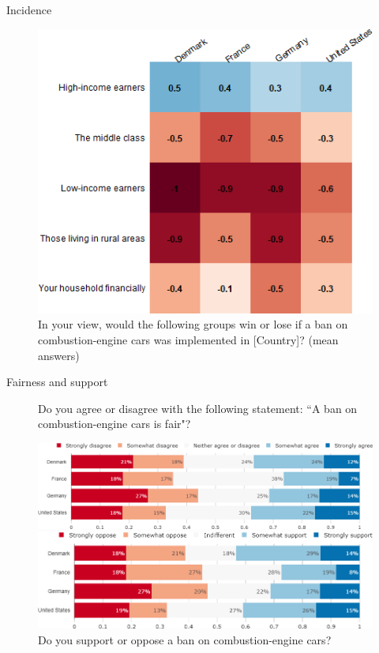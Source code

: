 \documentclass[aspectratio=169,9pt,dvipsnames]{beamer}
\begin{document}
\begin{frame}{Incidence}%
\begin{figure}[h!]
\centering
\caption{In your view, would the following groups win or lose if a ban on combustion-engine cars was implemented in [Country]? (mean answers)}
\includegraphics[width=.45\textwidth]{../figures/country_comparison/standard_win_lose_mean_countries.png}
\end{figure}
\end{frame}

\begin{frame}{Fairness and support}%
\begin{figure}[h!]
\centering
\caption{Do you agree or disagree with the following statement: ``A ban on combustion-engine cars is fair"?}
\includegraphics[width=.7\textwidth]{../figures/country_comparison/standard_fair_countries.png}
\vspace{.5cm}
\centering
\caption{Do you support or oppose a ban on combustion-engine cars?}
\includegraphics[width=.7\textwidth]{../figures/country_comparison/standard_support_countries.png}
\end{figure}

\end{frame}
\end{document}

